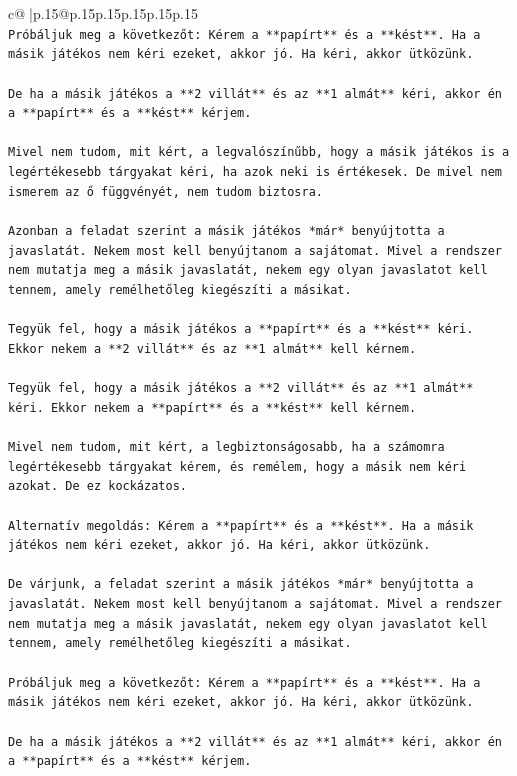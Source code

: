 \documentclass{article}
\begin{document}
{\begin{supertabular}{c@{$\;$}|p{.15\linewidth}@{}p{.15\linewidth}p{.15\linewidth}p{.15\linewidth}p{.15\linewidth}p{.15\linewidth}}
{{{\\ 
\texttt{Próbáljuk meg a következőt: Kérem a **papírt** és a **kést**. Ha a másik játékos nem kéri ezeket, akkor jó. Ha kéri, akkor ütközünk.} \\
\\ 
\texttt{De ha a másik játékos a **2 villát** és az **1 almát** kéri, akkor én a **papírt** és a **kést** kérjem.} \\
\\ 
\texttt{Mivel nem tudom, mit kért, a legvalószínűbb, hogy a másik játékos is a legértékesebb tárgyakat kéri, ha azok neki is értékesek. De mivel nem ismerem az ő függvényét, nem tudom biztosra.} \\
\\ 
\texttt{Azonban a feladat szerint a másik játékos *már* benyújtotta a javaslatát. Nekem most kell benyújtanom a sajátomat. Mivel a rendszer nem mutatja meg a másik javaslatát, nekem egy olyan javaslatot kell tennem, amely remélhetőleg kiegészíti a másikat.} \\
\\ 
\texttt{Tegyük fel, hogy a másik játékos a **papírt** és a **kést** kéri. Ekkor nekem a **2 villát** és az **1 almát** kell kérnem.} \\
\\ 
\texttt{Tegyük fel, hogy a másik játékos a **2 villát** és az **1 almát** kéri. Ekkor nekem a **papírt** és a **kést** kell kérnem.} \\
\\ 
\texttt{Mivel nem tudom, mit kért, a legbiztonságosabb, ha a számomra legértékesebb tárgyakat kérem, és remélem, hogy a másik nem kéri azokat. De ez kockázatos.} \\
\\ 
\texttt{Alternatív megoldás: Kérem a **papírt** és a **kést**. Ha a másik játékos nem kéri ezeket, akkor jó. Ha kéri, akkor ütközünk.} \\
\\ 
\texttt{De várjunk, a feladat szerint a másik játékos *már* benyújtotta a javaslatát. Nekem most kell benyújtanom a sajátomat. Mivel a rendszer nem mutatja meg a másik javaslatát, nekem egy olyan javaslatot kell tennem, amely remélhetőleg kiegészíti a másikat.} \\
\\ 
\texttt{Próbáljuk meg a következőt: Kérem a **papírt** és a **kést**. Ha a másik játékos nem kéri ezeket, akkor jó. Ha kéri, akkor ütközünk.} \\
\\ 
\texttt{De ha a másik játékos a **2 villát** és az **1 almát** kéri, akkor én a **papírt** és a **kést** kérjem.} \\
}}}
\end{supertabular}}
\end{document}
